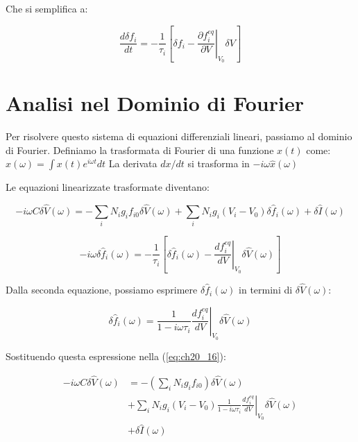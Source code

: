 Che si semplifica a:

\begin{equation} \label{eq:ch20_15}
\frac{d\delta f_{i}}{dt} = -\frac{1}{\tau_{i}}\left[\delta f_{i} - \left.\frac{\partial f_{i}^{eq}}{\partial V}\right|_{V_{0}}\delta V\right]
\end{equation}


\section{Analisi nel Dominio di Fourier}
Per risolvere questo sistema di equazioni differenziali lineari, passiamo al dominio di Fourier.
Definiamo la trasformata di Fourier di una funzione $x(t)$ come:
$\hat{x}(\omega) = \int x(t)e^{i\omega t}dt$
La derivata $dx/dt$ si trasforma in $-i\omega \hat{x}(\omega)$

Le equazioni linearizzate trasformate diventano:

\begin{equation} \label{eq:ch20_16}
-i\omega C \delta\hat{V}(\omega) = -\sum_{i}N_ig_{i}f_{i0}\delta\hat{V}(\omega) + \sum_{i}N_ig_{i}(V_{i}-V_{0})\delta\hat{f}_{i}(\omega) + \delta\hat{I}(\omega)
\end{equation}

\begin{equation} \label{eq:ch20_17}
-i\omega\delta\hat{f}_{i}(\omega) = -\frac{1}{\tau_{i}}\left[\delta\hat{f}_{i}(\omega) - \left.\frac{df_{i}^{eq}}{dV}\right|_{V_{0}}\delta\hat{V}(\omega)\right]
\end{equation}

Dalla seconda equazione, possiamo esprimere $\delta\hat{f}_{i}(\omega)$ in termini di $\delta\hat{V}(\omega)$:

\begin{equation} \label{eq:ch20_18}
\delta\hat{f}_{i}(\omega) = \frac{1}{1-i\omega\tau_{i}}\left.\frac{df_{i}^{eq}}{dV}\right|_{V_{0}}\delta\hat{V}(\omega)
\end{equation}

Sostituendo questa espressione nella (\ref{eq:ch20_16}):

\begin{align*} 
-i\omega C \delta\hat{V}(\omega) &= -\left(\sum_{i}N_ig_{i}f_{i0}\right)\delta\hat{V}(\omega) \\
&+ \sum_{i}N_ig_{i}(V_{i}-V_{0})\frac{1}{1-i\omega\tau_{i}}\left.\frac{df_{i}^{eq}}{dV}\right|_{V_{0}}\delta\hat{V}(\omega)\\ 
&+ \delta\hat{I}(\omega) 
\end{align*}

